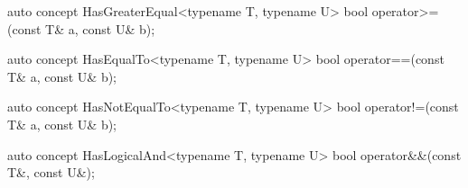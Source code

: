 \documentclass[american,twoside]{book}
\begin{document}
\begin{itemdescr}
\pnum
{}
\end{itemdescr}

\begin{itemdecl}
auto concept HasGreaterEqual<typename T, typename U> {
  bool operator>=(const T& a, const U& b);
}
\end{itemdecl}

\begin{itemdescr}
\pnum
{}
\end{itemdescr}

\pnum
{}

\begin{itemdecl}
auto concept HasEqualTo<typename T, typename U> {
  bool operator==(const T& a, const U& b);
}
\end{itemdecl}

\begin{itemdescr}
\pnum
{}
\end{itemdescr}

\begin{itemdecl}
auto concept HasNotEqualTo<typename T, typename U> {
  bool operator!=(const T& a, const U& b);
}
\end{itemdecl}

\begin{itemdescr}
\pnum
{}
\end{itemdescr}

\begin{itemdecl}
auto concept HasLogicalAnd<typename T, typename U> {
  bool operator&&(const T&, const U&);
}
\end{itemdecl}

\begin{itemdescr}
\pnum
{}
\end{itemdescr}
\end{document}

